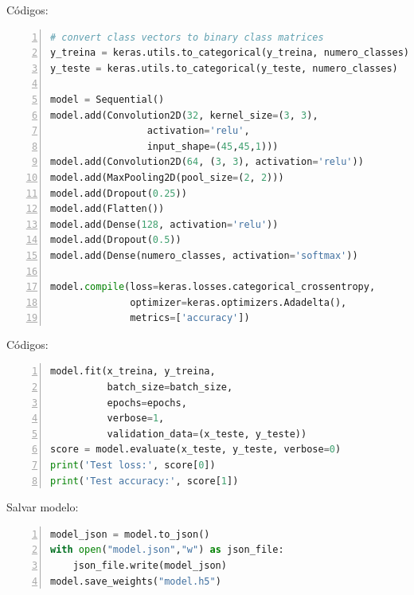 \documentclass[hyperref={pdfpagelabels=false},table]{beamer}
\begin{document}
\begin{frame}[containsverbatim]
	\begin{exampleblock}{Códigos:}
		\begin{lstlisting}[language=python, showspaces=false, breaklines=true,
		keepspaces=true, numbers=left, numberfirstline=false]
# convert class vectors to binary class matrices
y_treina = keras.utils.to_categorical(y_treina, numero_classes)
y_teste = keras.utils.to_categorical(y_teste, numero_classes)

model = Sequential()
model.add(Convolution2D(32, kernel_size=(3, 3),
                 activation='relu',
                 input_shape=(45,45,1)))
model.add(Convolution2D(64, (3, 3), activation='relu'))
model.add(MaxPooling2D(pool_size=(2, 2)))
model.add(Dropout(0.25))
model.add(Flatten())
model.add(Dense(128, activation='relu'))
model.add(Dropout(0.5))
model.add(Dense(numero_classes, activation='softmax'))

model.compile(loss=keras.losses.categorical_crossentropy,
              optimizer=keras.optimizers.Adadelta(),
              metrics=['accuracy'])
		\end{lstlisting}
	\end{exampleblock}
\end{frame}

\begin{frame}[containsverbatim]
	\begin{exampleblock}{Códigos:}
		\begin{lstlisting}[language=python, showspaces=false, breaklines=true,
		keepspaces=true, numbers=left, numberfirstline=false]
model.fit(x_treina, y_treina,
          batch_size=batch_size,
          epochs=epochs,
          verbose=1,
          validation_data=(x_teste, y_teste))
score = model.evaluate(x_teste, y_teste, verbose=0)
print('Test loss:', score[0])
print('Test accuracy:', score[1])

		\end{lstlisting}
	\end{exampleblock}
	\begin{block}{Salvar modelo:}
		\begin{lstlisting}[language=python, showspaces=false,
		breaklines=true,keepspaces=true, numbers=left, numberfirstline=false] model_json = model.to_json()
with open("model.json","w") as json_file:
	json_file.write(model_json)
model.save_weights("model.h5")
		\end{lstlisting}
	\end{block}
\end{frame}
\end{document}

